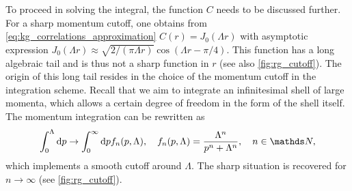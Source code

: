 
To proceed in solving the integral, the function $C$ needs to be discussed further.
For a sharp momentum cutoff, one obtains from \cref{eq:kg_correlations_approximation} $C(r) = J_0(\Lambda r)$ with asymptotic expression $J_0(\Lambda r)\approx\sqrt{2/(\pi \Lambda r)}\cos(\Lambda r-\pi/4)$.
This function has a long algebraic tail and is thus not a sharp function in $r$ (see also \cref{fig:rg_cutoff}).
The origin of this long tail resides in the choice of the momentum cutoff in the integration scheme.
Recall that we aim to integrate an infinitesimal shell of large momenta, which allows a certain degree of freedom in the form of the shell itself.
The momentum integration can be rewritten as
\begin{align}
    \int_{0}^{\Lambda}\rd p \rightarrow \int_{0}^\infty\rd p f_n(p,\Lambda),
    \quad
    f_n(p,\Lambda) = \frac{\Lambda^n}{p^n+\Lambda^n},
    \quad
    n\in\mathds N,
    \label{eq:integral_cutoff}
\end{align}
which implements a smooth cutoff around $\Lambda$.
The sharp situation is recovered for $n\rightarrow\infty$ (see \cref{fig:rg_cutoff}).
